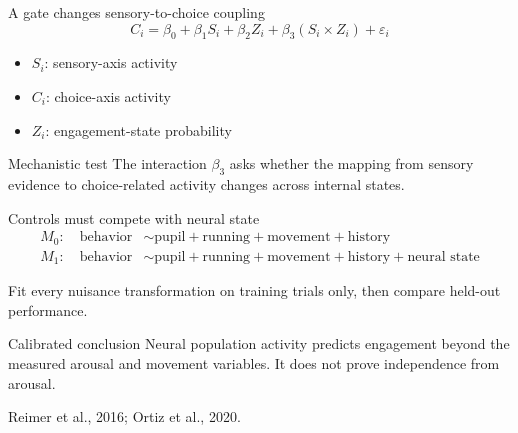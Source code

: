\documentclass[aspectratio=169,10pt]{beamer}
\newcommand{\sourceNote}[1]{%
  \par\vfill{\fontsize{6}{7}\selectfont\color{NMAMidGray}#1}%
}
\begin{document}
\begin{frame}{A gate changes sensory-to-choice coupling}
  \[
    C_i=\beta_0+\beta_1S_i+\beta_2Z_i
      +\beta_3(S_i\times Z_i)+\varepsilon_i
  \]

  \begin{itemize}
    \item $S_i$: sensory-axis activity
    \item $C_i$: choice-axis activity
    \item $Z_i$: engagement-state probability
  \end{itemize}

  \begin{block}{Mechanistic test}
    The interaction $\beta_3$ asks whether the mapping from sensory evidence to
    choice-related activity changes across internal states.
  \end{block}

\end{frame}


\begin{frame}{Controls must compete with neural state}
  \begin{align*}
    M_0:\quad \text{behavior} &\sim
      \text{pupil}+\text{running}+\text{movement}+\text{history} \\
    M_1:\quad \text{behavior} &\sim
      \text{pupil}+\text{running}+\text{movement}+\text{history}
      +\text{neural state}
  \end{align*}

  Fit every nuisance transformation on training trials only, then compare
  held-out performance.

  \begin{alertblock}{Calibrated conclusion}
    Neural population activity predicts engagement beyond the measured arousal
    and movement variables. It does not prove independence from arousal.
  \end{alertblock}

  \sourceNote{Reimer et al., 2016; Ortiz et al., 2020.}
\end{frame}
\end{document}
